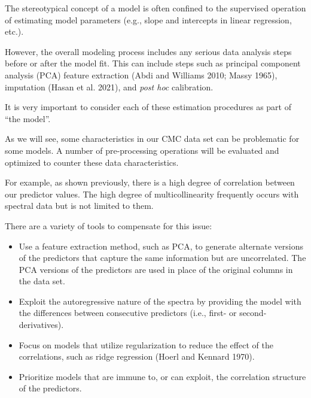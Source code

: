 \documentclass[
  letterpaper,
  DIV=11,
  numbers=noendperiod]{scrartcl}
\providecommand{\tightlist}{%
  \setlength{\itemsep}{0pt}\setlength{\parskip}{0pt}}\usepackage{longtable,booktabs,array}
\begin{document}
\begin{tcolorbox}[enhanced jigsaw, title=\textcolor{quarto-callout-important-color}{\faExclamation}\hspace{0.5em}{\textbf{WTF} \#7}, rightrule=.15mm, leftrule=.75mm, bottomtitle=1mm, opacityback=0, opacitybacktitle=0.6, bottomrule=.15mm, arc=.35mm, colframe=quarto-callout-important-color-frame, breakable, toprule=.15mm, toptitle=1mm, colback=white, titlerule=0mm, coltitle=black, left=2mm, colbacktitle=quarto-callout-important-color!10!white]

The stereotypical concept of a model is often confined to the supervised
operation of estimating model parameters (e.g., slope and intercepts in
linear regression, etc.).

However, the overall modeling process includes any serious data analysis
steps before or after the model fit. This can include steps such as
principal component analysis (PCA) feature extraction (Abdi and Williams
2010; Massy 1965), imputation (Hasan et al. 2021), and \emph{post hoc}
calibration.

It is very important to consider each of these estimation procedures as
part of ``the model''.

\end{tcolorbox}

As we will see, some characteristics in our CMC data set can be
problematic for some models. A number of pre-processing operations will
be evaluated and optimized to counter these data characteristics.

For example, as shown previously, there is a high degree of correlation
between our predictor values. The high degree of multicollinearity
frequently occurs with spectral data but is not limited to them.

There are a variety of tools to compensate for this issue:

\begin{itemize}
\tightlist
\item
  Use a feature extraction method, such as PCA, to generate alternate
  versions of the predictors that capture the same information but are
  uncorrelated. The PCA versions of the predictors are used in place of
  the original columns in the data set.
\item
  Exploit the autoregressive nature of the spectra by providing the
  model with the differences between consecutive predictors (i.e.,
  first- or second-derivatives).
\item
  Focus on models that utilize regularization to reduce the effect of
  the correlations, such as ridge regression (Hoerl and Kennard 1970).
\item
  Prioritize models that are immune to, or can exploit, the correlation
  structure of the predictors.
\end{itemize}
\end{document}
